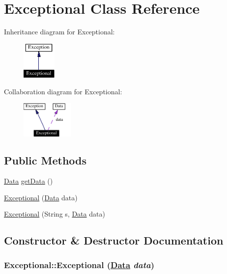 \hypertarget{classExceptional}{
\section{Exceptional  Class Reference}
\label{classExceptional}
}
Inheritance diagram for Exceptional:\begin{figure}[H]
\begin{center}
\leavevmode
\includegraphics[width=47pt]{classExceptional__inherit__graph}
\end{center}
\end{figure}
Collaboration diagram for Exceptional:\begin{figure}[H]
\begin{center}
\leavevmode
\includegraphics[width=73pt]{classExceptional__coll__graph}
\end{center}
\end{figure}
\subsection*{Public Methods}
\begin{CompactItemize}
\item 
\hyperlink{interfaceData}{Data} \hyperlink{classExceptional_a0}{get\-Data} ()
\item 
\hyperlink{classExceptional_a1}{Exceptional} (\hyperlink{interfaceData}{Data} data)
\item 
\hyperlink{classExceptional_a2}{Exceptional} (String s, \hyperlink{interfaceData}{Data} data)
\end{CompactItemize}


\subsection{Constructor \& Destructor Documentation}
\hypertarget{classExceptional_a1}{
\subsubsection[Exceptional]{\setlength{\rightskip}{0pt plus 5cm}Exceptional::Exceptional (\hyperlink{interfaceData}{Data} {\em data})}}
\label{classExceptional_a1}




